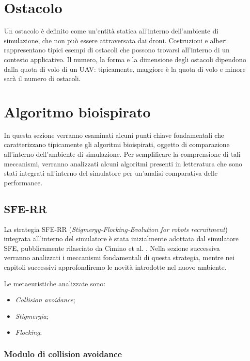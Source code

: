 \section{Ostacolo}

Un ostacolo è definito come un'entità statica all'interno dell'ambiente di simulazione, che non può essere attraversata dai droni.
Costruzioni e alberi rappresentano tipici esempi di ostacoli che possono trovarsi all'interno di un contesto applicativo.
Il numero, la forma e la dimensione degli ostacoli dipendono dalla quota di volo di un UAV: tipicamente, maggiore è la quota di volo e minore sarà il numero di ostacoli.

\section{Algoritmo bioispirato}

In questa sezione verranno esaminati alcuni punti chiave fondamentali che caratterizzano tipicamente gli algoritmi bioispirati, oggetto di comparazione all'interno dell'ambiente di simulazione.
Per semplificare la comprensione di tali meccanismi, verranno analizzati alcuni algoritmi presenti in letteratura che sono stati integrati all'interno del simulatore per un'analisi comparativa delle performance. 

\subsection{SFE-RR}

La strategia SFE-RR (\textit{Stigmergy-Flocking-Evolution for robots recruitment}) integrata all'interno del simulatore è stata inizialmente adottata dal simulatore SFE, pubblicamente rilasciato da Cimino et al. \cite{cimino2019adaptive}.
Nella sezione successiva verranno analizzati i meccanismi fondamentali di questa strategia, mentre nei capitoli successivi approfondiremo le novità introdotte nel nuovo ambiente.

Le metaeuristiche analizzate sono:

\begin{itemize}
    \item \textit{Collision avoidance};
    \item \textit{Stigmergia};
    \item \textit{Flocking};
\end{itemize}

\subsubsection{Modulo di collision avoidance}

